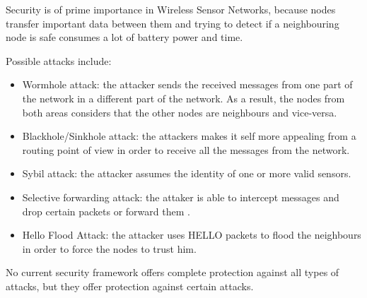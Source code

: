 Security is of prime importance in Wireless Sensor Networks, because nodes transfer important data between them and trying to detect if a neighbouring node is safe consumes a lot of battery power and time.

Possible attacks include:
\begin{itemize}

\item Wormhole attack: the attacker sends the received messages from one part of the network in a different part of the network. As a result, the nodes from both areas considers that the other nodes are neighbours and vice-versa.
\item Blackhole/Sinkhole attack: the attackers makes it self more appealing from a routing point of view in order to receive all the messages from the network.
\item Sybil attack: the attacker assumes the identity of one or more valid sensors\cite{newsome2004sybil}.
\item Selective forwarding attack: the attaker is able to intercept messages and drop certain packets or forward them \cite{kaplantzis2007detecting}.
\item Hello Flood Attack: the attacker uses HELLO packets to flood the neighbours in order to force the nodes to trust him.

\end{itemize}

No current security framework offers complete protection against all types of attacks, but they offer protection against certain attacks. 


